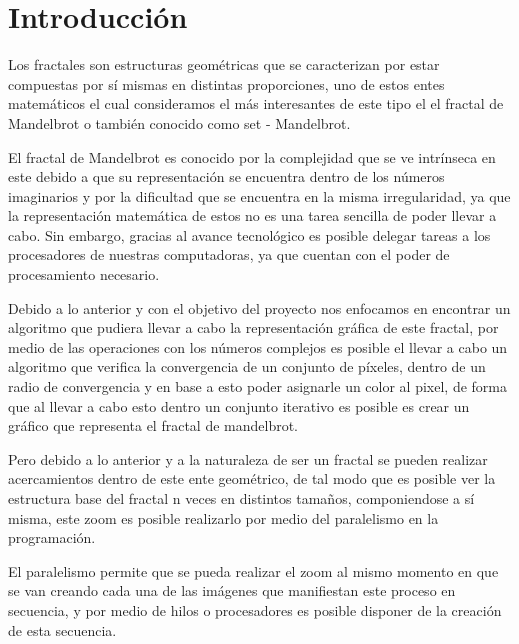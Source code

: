 \documentclass[12pt,a4paper]{article}
\begin{document}
	\restoregeometry
	\renewcommand{\footrulewidth}{1pt}
	\tableofcontents
	\vfill
	\clearpage
	
	\section{Introducción}
		Los fractales son estructuras geométricas que se caracterizan por estar compuestas por sí mismas en distintas proporciones, uno de estos entes matemáticos el cual consideramos el más interesantes de este tipo el el fractal de Mandelbrot o también conocido como set - Mandelbrot.
		
		El fractal de Mandelbrot es conocido por la complejidad que se ve intrínseca en este debido a que su representación se encuentra dentro de los números imaginarios y por la dificultad que se encuentra en la misma irregularidad, ya que la representación matemática de estos no es una tarea sencilla de poder llevar a cabo. Sin embargo, gracias al avance tecnológico es posible delegar tareas a los procesadores de nuestras computadoras, ya que cuentan con el poder de procesamiento necesario. 
		
		Debido a lo anterior y con el objetivo del proyecto nos enfocamos en encontrar un algoritmo que pudiera llevar a cabo la representación gráfica de este fractal, por medio de las operaciones con los números complejos es posible el llevar a cabo un algoritmo que verifica la convergencia de un conjunto de píxeles, dentro de un radio de convergencia y en base a esto poder asignarle un color al pixel, de forma que al llevar a cabo esto dentro un conjunto iterativo es posible es crear un gráfico que representa el fractal de mandelbrot.
		
		Pero debido a lo anterior y a la naturaleza de ser un fractal se pueden realizar acercamientos dentro de este ente geométrico, de tal modo que es posible ver la estructura base del fractal n veces en distintos tamaños, componiendose a sí misma, este zoom es posible realizarlo por medio del paralelismo en la programación.
		
		El paralelismo permite que se pueda realizar el zoom al mismo momento en que se van creando cada una de las imágenes que manifiestan este proceso en secuencia, y por medio de hilos o procesadores es posible disponer de la creación de esta secuencia.
		
\end{document}
